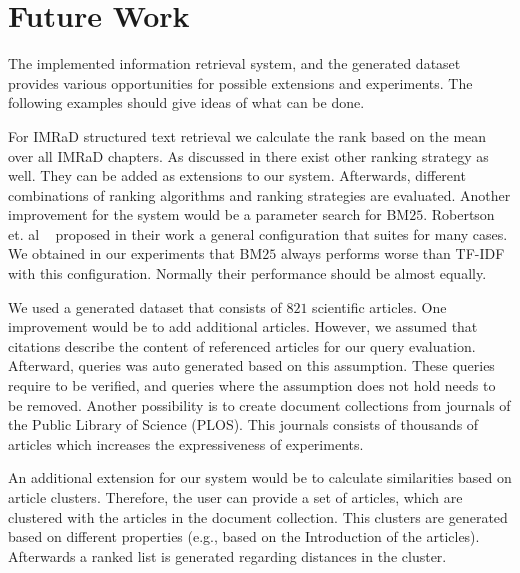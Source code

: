 \section{Future Work}
\label{sec:future_work}

The implemented information retrieval system, and the generated dataset provides various opportunities for possible extensions and experiments. The following examples should give ideas of what can be done.

For IMRaD structured text retrieval we calculate the rank based on the mean over all IMRaD chapters. As discussed in  there exist other ranking strategy as well. They can be added as extensions to our system. Afterwards, different combinations of ranking algorithms and ranking strategies are evaluated. Another improvement for the system would be a parameter search for BM$25$. Robertson et. al ~\cite{RobertsonWJHG94} proposed in their work a general configuration that suites for many cases. We obtained in our experiments that BM$25$ always performs worse than TF-IDF with this configuration. Normally their performance should be almost equally.

We used a generated dataset that consists of $821$ scientific articles. One improvement would be to add additional articles. However, we assumed that citations describe the content of referenced articles for our query evaluation. Afterward, queries was auto generated based on this assumption. These queries require to be verified, and queries where the assumption does not hold needs to be removed. Another possibility is to create document collections from journals of the Public Library of Science (PLOS). This journals consists of thousands of articles which increases the expressiveness of experiments.

An additional extension for our system would be to calculate similarities based on article clusters. Therefore, the user can provide a set of articles, which are clustered with the articles in the document collection. This clusters are generated based on different properties (e.g., based on the Introduction of the articles). Afterwards a ranked list is generated regarding distances in the cluster. 
